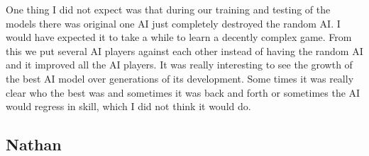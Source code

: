 One thing I did not expect was that during our training and testing of the models there was original one AI just completely destroyed the random AI. I would have expected it to take a while to learn a decently complex game. From this we put several AI players against each other instead of having the random AI and it improved all the AI players. It was really interesting to see the growth of the best AI model over generations of its development. Some times it was really clear who the best was and sometimes it was back and forth or sometimes the AI would regress in skill, which I did not think it would do.
\subsection{Nathan}



